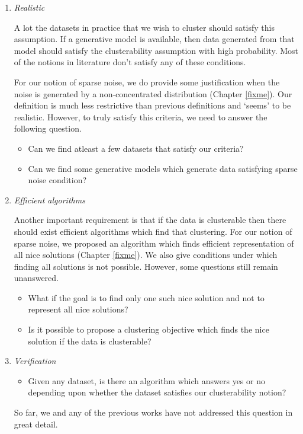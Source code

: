 \documentclass[letterpaper,12pt,titlepage,oneside,final]{book}
\begin{document}
\begin{enumerate}
\item \emph{Realistic}

A lot the datasets in practice that we wish to cluster should satisfy this assumption. If a generative model is available, then data generated from that model should satisfy the clusterability assumption with high probability. Most of the notions in literature don't satisfy any of these conditions.

For our notion of sparse noise, we do provide some justification when the noise is generated by a non-concentrated distribution (Chapter \ref{fixme}). Our definition is much less restrictive than previous definitions and `seems' to be realistic. However, to truly satisfy this criteria, we need to answer the following question. 
\begin{itemize}
\item Can we find atleast a few datasets that satisfy our criteria?
\item Can we find some generative models which generate data satisfying sparse noise condition?
\end{itemize}

\item \emph{Efficient algorithms}

Another important requirement is that if the data is clusterable then there should exist efficient algorithms which find that clustering. For our notion of sparse noise, we proposed an algorithm which finds efficient representation of all nice solutions (Chapter \ref{fixme}). We also give conditions under which finding all solutions is not possible. However, some questions still remain unanswered. \begin{itemize}
\item What if the goal is to find only one such nice solution and not to represent all nice solutions?
\item Is it possible to propose a clustering objective which finds the nice solution if the data is clusterable? 
\end{itemize}

\item \emph{Verification}
\begin{itemize}
\item Given any dataset, is there an algorithm which answers yes or no depending upon whether the dataset satisfies our clusterability notion? 
\end{itemize}
So far, we and any of the previous works have not addressed this question in great detail.


\end{enumerate}
\end{document}
